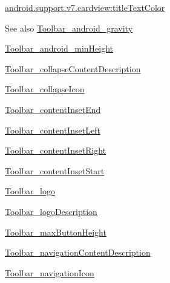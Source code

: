 {\ttfamily \hyperlink{classandroid_1_1support_1_1v7_1_1cardview_1_1R_1_1styleable_a575dc8e25cd7d21b6d8b14cae397fdae}{android.\+support.\+v7.\+cardview\+:title\+Text\+Color}}

\begin{DoxySeeAlso}{See also}
\hyperlink{classandroid_1_1support_1_1v7_1_1cardview_1_1R_1_1styleable_a303e5186407298acc48895e58eb6f585}{Toolbar\+\_\+android\+\_\+gravity} 

\hyperlink{classandroid_1_1support_1_1v7_1_1cardview_1_1R_1_1styleable_afbb49f332c51e210fbfa15d408af281d}{Toolbar\+\_\+android\+\_\+min\+Height} 

\hyperlink{classandroid_1_1support_1_1v7_1_1cardview_1_1R_1_1styleable_a7f64c62bccb20000a1ce0dead70df1b9}{Toolbar\+\_\+collapse\+Content\+Description} 

\hyperlink{classandroid_1_1support_1_1v7_1_1cardview_1_1R_1_1styleable_a8eb012775ab40a813cfab4b5965dbc11}{Toolbar\+\_\+collapse\+Icon} 

\hyperlink{classandroid_1_1support_1_1v7_1_1cardview_1_1R_1_1styleable_a7b083162c37953ab9198af4e458c5c85}{Toolbar\+\_\+content\+Inset\+End} 

\hyperlink{classandroid_1_1support_1_1v7_1_1cardview_1_1R_1_1styleable_afa00957dff7d0d6a25908e2bb3a2b56c}{Toolbar\+\_\+content\+Inset\+Left} 

\hyperlink{classandroid_1_1support_1_1v7_1_1cardview_1_1R_1_1styleable_a9029bc8fbf941277cd67da6b7fd92668}{Toolbar\+\_\+content\+Inset\+Right} 

\hyperlink{classandroid_1_1support_1_1v7_1_1cardview_1_1R_1_1styleable_ac1839a6fcec9ba5ef65e542846ca28a7}{Toolbar\+\_\+content\+Inset\+Start} 

\hyperlink{classandroid_1_1support_1_1v7_1_1cardview_1_1R_1_1styleable_ac5bdebe83f2a68287e8ab3f0ddb5920c}{Toolbar\+\_\+logo} 

\hyperlink{classandroid_1_1support_1_1v7_1_1cardview_1_1R_1_1styleable_a8faae4fbd9959da0d13b10544ea5be98}{Toolbar\+\_\+logo\+Description} 

\hyperlink{classandroid_1_1support_1_1v7_1_1cardview_1_1R_1_1styleable_a26e906d28bad0693208a7f57617b8316}{Toolbar\+\_\+max\+Button\+Height} 

\hyperlink{classandroid_1_1support_1_1v7_1_1cardview_1_1R_1_1styleable_a1530a92c6708dc96b49416ed9e722bc5}{Toolbar\+\_\+navigation\+Content\+Description} 

\hyperlink{classandroid_1_1support_1_1v7_1_1cardview_1_1R_1_1styleable_af69916d5ccab7224ea96ec17a90ccc6a}{Toolbar\+\_\+navigation\+Icon} 


\end{DoxySeeAlso}
